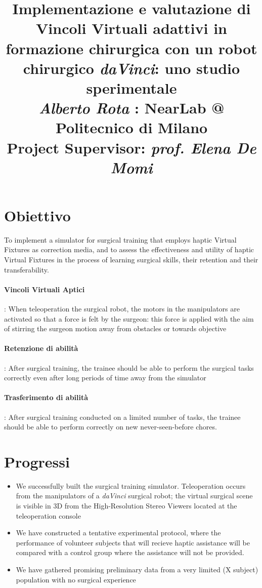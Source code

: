 \documentclass{article}
\title{\textbf{Implementazione e valutazione di Vincoli Virtuali adattivi in formazione chirurgica con un robot chirurgico \textit{daVinci}: uno studio sperimentale}
\\
\vspace{0.5cm}\large{\textit{Alberto Rota} : NearLab @ Politecnico di Milano}
\\
\vspace{0.4cm}\small{Project Supervisor: \textit{prof. Elena De Momi}}
}
\author{}
\date{}
\begin{document}
\maketitle

\section{Obiettivo}
To implement a simulator for surgical training that employs haptic Virtual Fixtures as correction media, and to assess the effectiveness and utility of haptic Virtual Fixtures in the process of learning surgical skills, their retention and their transferability.

\paragraph*{Vincoli Virtuali Aptici}: When teleoperation the surgical robot, the motors in the manipulators are activated so that a force is felt by the surgeon: this force is applied with the aim of stirring the surgeon motion away from obstacles or towards objective
\paragraph*{Retenzione di abilità}: After surgical training, the trainee should be able to perform the surgical tasks correctly even after long periods of time away from the simulator
\paragraph*{Trasferimento di abilità}: After surgical training conducted on a limited number of tasks, the trainee should be able to perform correctly on new never-seen-before chores.

\section{Progressi}
\begin{itemize}
  \item  We successfully built the surgical training simulator. Teleoperation occurs from the manipulators of a \textit{daVinci} surgical robot; the virtual surgical scene is visible in 3D from the High-Resolution Stereo Viewers located at the teleoperation console
  \item We have constructed a tentative experimental protocol, where the performance of volunteer subjects that will recieve haptic assistance will be compared with a control group where the assistance will not be provided.
  \item We have gathered promising preliminary data from a very limited (X subject) population with no surgical experience
\end{itemize}
\end{document}
